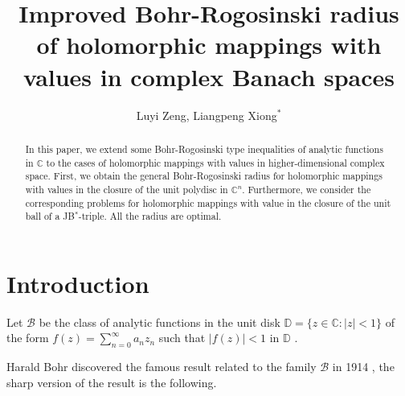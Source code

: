 \documentclass{birkjour}
\theoremstyle{plain}
\theoremstyle{definition}
\theoremstyle{definition}
\begin{document}
\title[Improved Bohr-Rogosinski radius for holomorphic mappings with values in complex Banach spaces]
{Improved Bohr-Rogosinski radius of holomorphic mappings with values in complex Banach spaces}

\author[L.Y. Zeng, L.P. Xiong]{Luyi Zeng, Liangpeng Xiong$^*$}
\address{School of Mathematics Science, Jiangxi Science and Technology Normal University, Nanchang $330038$
	Jiangxi, People's Republic of China}



\begin{abstract}
In this paper, we extend some Bohr-Rogosinski type inequalities of analytic functions in $\mathbb{C}$ to the cases of holomorphic mappings with values in higher-dimensional complex space. First, we obtain the general Bohr-Rogosinski radius for holomorphic mappings with values in the closure of the unit polydisc in $\mathbb{C} ^n$. Furthermore, we consider the corresponding problems for holomorphic mappings with value in the closure of the unit ball of a JB$^*$-triple. All the radius are optimal.
\end{abstract}

\maketitle
\section{Introduction} \label{sec1}
Let $\mathcal{B} $ be the class of analytic functions in the unit disk $\mathbb{D}=\{z\in \mathbb{C} : |z|<1\}$  of the form  $f(z)=\sum_{n=0}^{\infty}a_{n}z_{n} $ such that $\left | f(z) \right | < 1$ in $\mathbb{D}$ .
\par
Harald Bohr discovered the famous result related to the family  $\mathcal{B} $ in 1914 \cite{ref9}, the sharp version of the result is the following.
\end{document}
